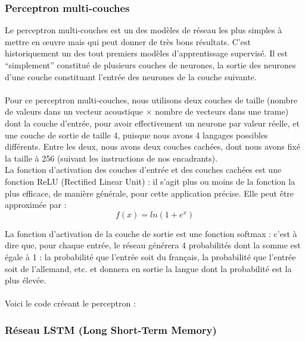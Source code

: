 \documentclass{article}
\begin{document}
\subsubsection{Perceptron multi-couches}

Le perceptron multi-couches est un des modèles de réseau les plus simples à mettre en œuvre mais qui peut donner de très bons résultats. C'est historiquement un des tout premiers modèles d'apprentissage supervisé. Il est ``simplement'' constitué de plusieurs couches de neurones, la sortie des neurones d'une couche constituant l'entrée des neurones de la couche suivante.\\
 \\
Pour ce perceptron multi-couches, nous utilisons deux couches de taille (nombre de valeurs dans un vecteur acoustique $\times$ nombre de vecteurs dans une trame) dont la couche d'entrée, pour avoir effectivement un neurone par valeur réelle, et une couche de sortie de taille 4, puisque nous avons 4 langages possibles différents. Entre les deux, nous avons deux couches cachées, dont nous avons fixé la taille à 256 (suivant les instructions de nos encadrants).\\
La fonction d'activation des couches d'entrée et des couches cachées est une fonction ReLU (Rectified Linear Unit) : il s'agit plus ou moins de la fonction la plus efficace, de manière générale, pour cette application précise. Elle peut être approximée par :
$$ f(x) = ln(1 + e^{x}) $$

La fonction d'activation de la couche de sortie est une fonction softmax : c'est à dire que, pour chaque entrée, le réseau générera 4 probabilités dont la somme est égale à 1 : la probabilité que l'entrée soit du français, la probabilité que l'entrée soit de l'allemand, etc. et donnera en sortie la langue dont la probabilité est la plus élevée.\\
 \\
Voici le code créeant le perceptron :\\

\subsubsection{Réseau LSTM (Long Short-Term Memory)}
\end{document}
